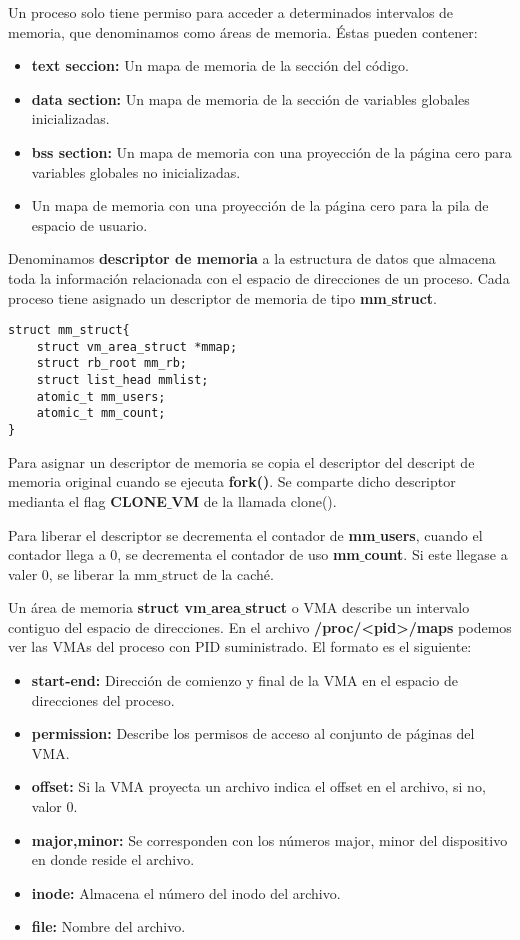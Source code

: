 Un proceso solo tiene permiso para acceder a determinados intervalos de memoria, que denominamos como áreas de memoria. Éstas pueden contener:

\begin{itemize}
	\item\textbf{text seccion:} Un mapa de memoria de la sección del código.
	\item\textbf{data section:} Un mapa de memoria de la sección de variables globales inicializadas.
	\item\textbf{bss section:} Un mapa de memoria con una proyección de la página cero para variables globales no inicializadas.
	\item Un mapa de memoria con una proyección de la página cero para la pila de espacio de usuario.
\end{itemize}

Denominamos \textbf{descriptor de memoria} a la estructura de datos que almacena toda la información relacionada con el espacio de direcciones de un proceso. Cada proceso tiene asignado un descriptor de memoria de tipo \textbf{mm$\_$struct}.

\begin{lstlisting}
struct mm_struct{
	struct vm_area_struct *mmap;
	struct rb_root mm_rb;
	struct list_head mmlist;
	atomic_t mm_users;
	atomic_t mm_count;
}
\end{lstlisting}

Para asignar un descriptor de memoria se copia el descriptor del descript de memoria original cuando se ejecuta \textbf{fork()}. Se comparte dicho descriptor medianta el flag \textbf{CLONE$\_$VM} de la llamada clone().

Para liberar el descriptor se decrementa el contador de \textbf{mm$\_$users}, cuando el contador llega a 0, se decrementa el contador de uso \textbf{mm$\_$count}. Si este llegase a valer 0, se liberar la mm$\_$struct de la caché.


Un área de memoria \textbf{struct vm$\_$area$\_$struct} o VMA describe un intervalo contiguo del espacio de direcciones. En el archivo \textbf{/proc/<pid>/maps} podemos ver las VMAs del proceso con PID suministrado. El formato es el siguiente:

\begin{itemize}
	\item\textbf{start-end:} Dirección de comienzo y final de la VMA en el espacio de direcciones del proceso.
	\item\textbf{permission:} Describe los permisos de acceso al conjunto de páginas del VMA.
	\item\textbf{offset:} Si la VMA proyecta un archivo indica el offset en el archivo, si no, valor 0.
	\item\textbf{major,minor:} Se corresponden con los números major, minor del dispositivo en donde reside el archivo.
	\item\textbf{inode:} Almacena el número del inodo del archivo.
	\item\textbf{file:} Nombre del archivo.
\end{itemize}

